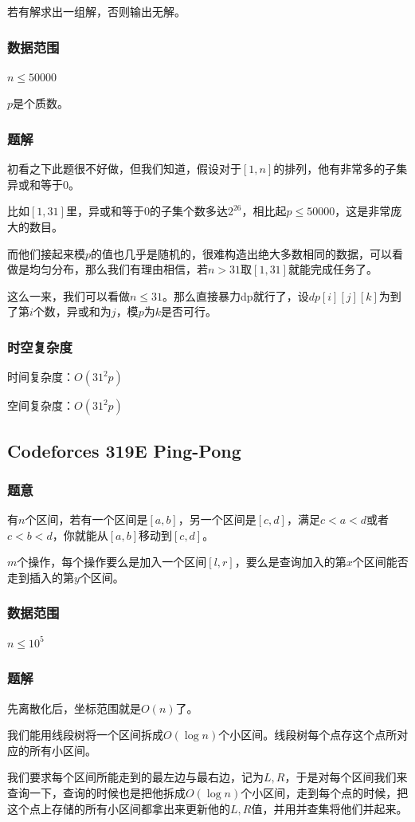 \documentclass{ctexart}
\begin{document}
若有解求出一组解，否则输出无解。
\subsubsection{数据范围}
$n \le 50000$

$p$是个质数。
\subsubsection{题解}
初看之下此题很不好做，但我们知道，假设对于$[1,n]$的排列，他有非常多的子集异或和等于$0$。

比如$[1,31]$里，异或和等于$0$的子集个数多达$2^{26}$，相比起$p \le 50000$，这是非常庞大的数目。

而他们接起来模$p$的值也几乎是随机的，很难构造出绝大多数相同的数据，可以看做是均匀分布，那么我们有理由相信，若$n>31$取$[1,31]$就能完成任务了。

这么一来，我们可以看做$n \le 31$。那么直接暴力dp就行了，设$dp[i][j][k]$为到了第$i$个数，异或和为$j$，模$p$为$k$是否可行。
\subsubsection{时空复杂度}
时间复杂度：$O(31^2 p)$

空间复杂度：$O(31^2 p)$
\subsection{Codeforces 319E Ping-Pong}
\subsubsection{题意}
有$n$个区间，若有一个区间是$[a,b]$，另一个区间是$[c,d]$，满足$c<a<d$或者$c<b<d$，你就能从$[a,b]$移动到$[c,d]$。

$m$个操作，每个操作要么是加入一个区间$[l,r]$，要么是查询加入的第$x$个区间能否走到插入的第$y$个区间。
\subsubsection{数据范围}
$n \le 10^5$
\subsubsection{题解}
先离散化后，坐标范围就是$O(n)$了。

我们能用线段树将一个区间拆成$O(\log n)$个小区间。线段树每个点存这个点所对应的所有小区间。

我们要求每个区间所能走到的最左边与最右边，记为$L,R$，于是对每个区间我们来查询一下，查询的时候也是把他拆成$O(\log n)$个小区间，走到每个点的时候，把这个点上存储的所有小区间都拿出来更新他的$L,R$值，并用并查集将他们并起来。
\end{document}
